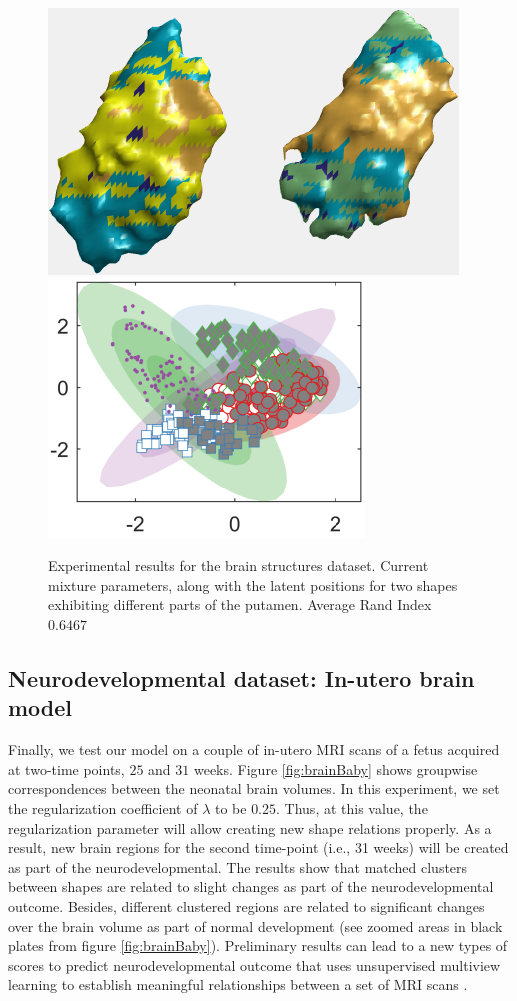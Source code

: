 \documentclass[]{article}
\begin{document}
\begin{figure}[ht!]
	\centering
	
	\includegraphics[width=0.45\linewidth]{img/putamen1MVMMexp1}
	\includegraphics[width=0.35\linewidth]{img/putamen1MVMMexp3}
	\caption{Experimental results for the brain structures dataset.  Current mixture parameters, along with the latent positions for two shapes exhibiting different parts of the putamen. Average Rand Index $0.6467$ }
	\label{fig:brainP}
\end{figure}


\subsection{Neurodevelopmental dataset: In-utero brain model}

Finally, we test our model on a couple of in-utero MRI scans of a fetus acquired at two-time points, $25$ and $31$ weeks. Figure \ref{fig:brainBaby} shows groupwise correspondences between the neonatal brain volumes. In this experiment, we set the regularization coefficient of $\lambda$ to be $0.25$. Thus, at this value, the regularization parameter will allow creating new shape relations properly. As a result, new brain regions for the second time-point (i.e., 31 weeks) will be created as part of the neurodevelopmental. The results show that matched clusters between shapes are related to slight changes as part of the neurodevelopmental outcome. Besides, different clustered regions are related to significant changes over the brain volume as part of normal development (see zoomed areas in black plates from figure \ref{fig:brainBaby}). Preliminary results can lead to a new types of scores to predict neurodevelopmental outcome that uses unsupervised multiview learning to establish meaningful relationships between a set of MRI scans \cite{NeuroBaby18}. 
\end{document}
